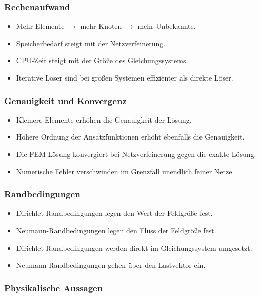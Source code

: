 \documentclass[a4paper]{article}
\begin{document}
\subsubsection*{Rechenaufwand}

\begin{itemize}
    \item Mehr Elemente $\rightarrow$ mehr Knoten $\rightarrow$ mehr Unbekannte.
    \item Speicherbedarf steigt mit der Netzverfeinerung.
    \item CPU-Zeit steigt mit der Gr\"o\ss e des Gleichungssystems.
    \item Iterative L\"oser sind bei gro\ss en Systemen effizienter als direkte L\"oser.
\end{itemize}

\subsubsection*{Genauigkeit und Konvergenz}

\begin{itemize}
    \item Kleinere Elemente erh\"ohen die Genauigkeit der L\"osung.
    \item H\"ohere Ordnung der Ansatzfunktionen erh\"oht ebenfalls die Genauigkeit.
    \item Die FEM-L\"osung konvergiert bei Netzverfeinerung gegen die exakte L\"osung.
    \item Numerische Fehler verschwinden im Grenzfall unendlich feiner Netze.
\end{itemize}

\subsubsection*{Randbedingungen}

\begin{itemize}
    \item Dirichlet-Randbedingungen legen den Wert der Feldgr\"o\ss e fest.
    \item Neumann-Randbedingungen legen den Fluss der Feldgr\"o\ss e fest.
    \item Dirichlet-Randbedingungen werden direkt im Gleichungssystem umgesetzt.
    \item Neumann-Randbedingungen gehen \"uber den Lastvektor ein.
\end{itemize}

\subsubsection*{Physikalische Aussagen}
\end{document}
